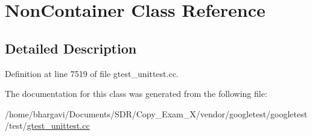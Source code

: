 \hypertarget{class_non_container}{}\section{Non\+Container Class Reference}
\label{class_non_container}


\subsection{Detailed Description}


Definition at line 7519 of file gtest\+\_\+unittest.\+cc.



The documentation for this class was generated from the following file\+:\begin{DoxyCompactItemize}
\item 
/home/bhargavi/\+Documents/\+S\+D\+R/\+Copy\+\_\+\+Exam\+\_\+X/vendor/googletest/googletest/test/\hyperlink{gtest__unittest_8cc}{gtest\+\_\+unittest.\+cc}\end{DoxyCompactItemize}
